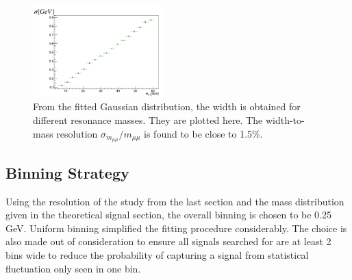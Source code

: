 \begin{figure}[!htb]
    \begin{center}
    \includegraphics[width=0.45\textwidth]{figures/chapter_dimuon/sigma}        
    \caption{
        From the fitted Gaussian distribution, the width is obtained for different resonance masses. They are plotted here. The width-to-mass resolution $\sigma_{m_{\mu\mu}}/m_{\mu\mu}$ is found to be close to 1.5\%.}
    \label{fig:sigma}
    \end{center}
\end{figure}
\FloatBarrier


\subsection{Binning Strategy}
\label{sec:binningresult}
Using the resolution of the study from the last section and the mass distribution given in the theoretical signal section, the overall binning is chosen to be 0.25 GeV. Uniform binning simplified the fitting procedure considerably. The choice is also made out of consideration to ensure all signals searched for are at least 2 bins wide to reduce the probability of capturing a signal from statistical fluctuation only seen in one bin.

%

